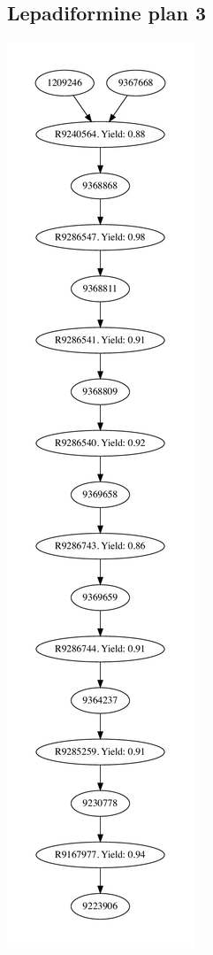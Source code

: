\documentclass[a4paper,10pt,titlepage]{paper}
\begin{document}
\subsection{Lepadiformine plan 3}
\centering
\includegraphics[scale=0.4]{Synteseplaner/Lepadiformine/plan3.pdf}
\label{Appendix::Lepadiformine3}
\end{document}
